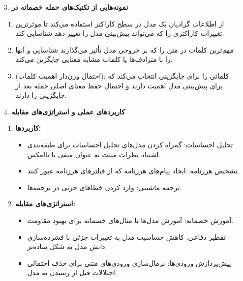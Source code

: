 \begin{qsolve}
	\begin{enumerate}
		\item [3.]\textbf{نمونه‌هایی از تکنیک‌های حمله خصمانه در }
		\begin{enumerate}
			\item 
از اطلاعات گرادیان یک مدل در سطح کاراکتر استفاده می‌کند تا موثرترین تغییرات کاراکتری را که می‌تواند پیش‌بینی مدل را تغییر دهد شناسایی کند.

			\item
مهم‌ترین کلمات در متن را که بر خروجی مدل تأثیر می‌گذارند شناسایی و آنها را با مترادف‌ها یا کلمات مشابه معنایی جایگزین می‌کند.

			\item 
			 (احتمال وزن‌دار اهمیت کلمات):
کلماتی را برای جایگزینی انتخاب می‌کند که برای پیش‌بینی مدل اهمیت دارند و احتمال حفظ معنای اصلی جمله بعد از جایگزینی را دارند.
		\end{enumerate}		
		
		
		
		
		
		\item [4.]\textbf{کاربردهای عملی و استراتژی‌های مقابله}
		\begin{enumerate}
			\item \textbf{کاربردها:}
			\begin{itemize}
				\item 
تحلیل احساسات: گمراه کردن مدل‌های تحلیل احساسات برای طبقه‌بندی اشتباه نظرات مثبت به عنوان منفی یا بالعکس.

				\item 
تشخیص هرزنامه: ایجاد پیام‌های هرزنامه که از فیلترهای هرزنامه عبور کنند.

				\item 
ترجمه ماشینی: وارد کردن خطاهای جزئی در ترجمه‌ها.
			\end{itemize}
			
			
			
			\item \textbf{استراتژی‌های مقابله:}
			\begin{itemize}
				\item 
آموزش خصمانه: آموزش مدل‌ها با مثال‌های خصمانه برای بهبود مقاومت.


				\item 
تقطیر دفاعی: کاهش حساسیت مدل به تغییرات جزئی با فشرده‌سازی دانش مدل به شکل ساده‌تر.


				\item 
پیش‌پردازش ورودی‌ها: نرمال‌سازی ورودی‌های متنی برای حذف احتمالی اختلالات قبل از رسیدن به مدل.
			\end{itemize}
		\end{enumerate}
	\end{enumerate}
\end{qsolve}







